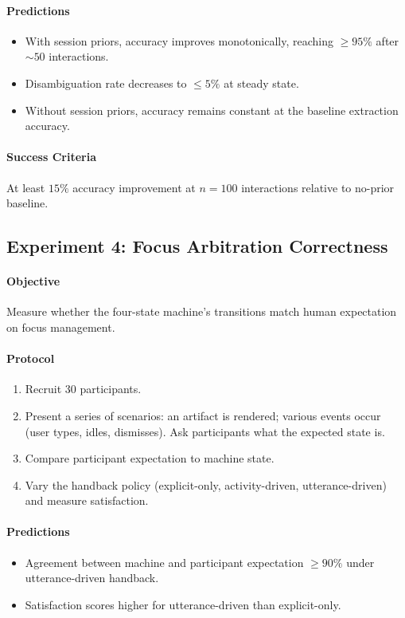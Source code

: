 \documentclass[11pt,a4paper]{article}
\theoremstyle{definition}
\theoremstyle{remark}
\begin{document}
\paragraph{Predictions}
\begin{itemize}
    \item With session priors, accuracy improves monotonically, reaching $\geq 95\%$ after $\sim 50$ interactions.
    \item Disambiguation rate decreases to $\leq 5\%$ at steady state.
    \item Without session priors, accuracy remains constant at the baseline extraction accuracy.
\end{itemize}

\paragraph{Success Criteria}
At least $15\%$ accuracy improvement at $n = 100$ interactions relative to no-prior baseline.

\subsection{Experiment 4: Focus Arbitration Correctness}

\paragraph{Objective} Measure whether the four-state machine's transitions match human expectation on focus management.

\paragraph{Protocol}
\begin{enumerate}
    \item Recruit 30 participants.
    \item Present a series of scenarios: an artifact is rendered; various events occur (user types, idles, dismisses). Ask participants what the expected state is.
    \item Compare participant expectation to machine state.
    \item Vary the handback policy (explicit-only, activity-driven, utterance-driven) and measure satisfaction.
\end{enumerate}

\paragraph{Predictions}
\begin{itemize}
    \item Agreement between machine and participant expectation $\geq 90\%$ under utterance-driven handback.
    \item Satisfaction scores higher for utterance-driven than explicit-only.
\end{itemize}
\end{document}
